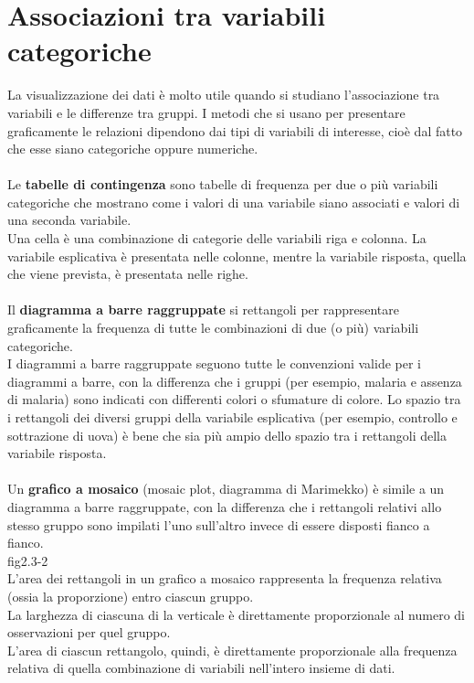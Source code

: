 \documentclass[drafts, 10pt]{book}
\begin{document}
\section{Associazioni tra variabili categoriche}
La visualizzazione dei dati è molto utile quando si studiano l'associazione tra variabili e le differenze tra gruppi. I metodi che si usano per presentare graficamente le relazioni dipendono dai tipi di variabili di interesse, cioè dal fatto che esse siano categoriche oppure numeriche.
\\
\\
Le \textbf{tabelle di contingenza} sono tabelle di frequenza per due o più variabili categoriche che mostrano come i valori di una variabile siano associati e valori di una seconda variabile. 
\\
Una cella è una combinazione di categorie delle variabili riga e colonna. La variabile esplicativa è presentata nelle colonne, mentre la variabile risposta, quella che viene prevista, è presentata nelle righe. 
\\
\\
Il \textbf{diagramma a barre raggruppate} si rettangoli per rappresentare graficamente la frequenza di tutte le combinazioni di due (o più) variabili categoriche.
\\
I diagrammi a barre raggruppate seguono tutte le convenzioni valide per i diagrammi a barre, con la differenza che i gruppi (per esempio, malaria e assenza di malaria) sono indicati con differenti colori o sfumature di colore.  Lo spazio tra i rettangoli dei diversi gruppi della variabile esplicativa (per esempio, controllo e sottrazione di uova) è bene che sia più ampio dello spazio tra i rettangoli della variabile risposta.
\\
\\
Un \textbf{grafico a mosaico} (mosaic plot, diagramma di Marimekko) è simile a un diagramma a barre raggruppate, con la differenza che i rettangoli relativi allo stesso gruppo sono impilati l'uno sull'altro invece di essere disposti fianco a fianco.
\\
fig2.3-2\label{fig2.3-2}
\\
L'area dei rettangoli in un grafico a mosaico rappresenta la frequenza relativa (ossia la proporzione) entro ciascun gruppo.
\\
La larghezza di ciascuna di la verticale è direttamente proporzionale al numero di osservazioni per quel gruppo.
\\
L'area di ciascun rettangolo, quindi, è direttamente proporzionale alla frequenza relativa di quella combinazione di variabili nell'intero insieme di dati.
\end{document}
